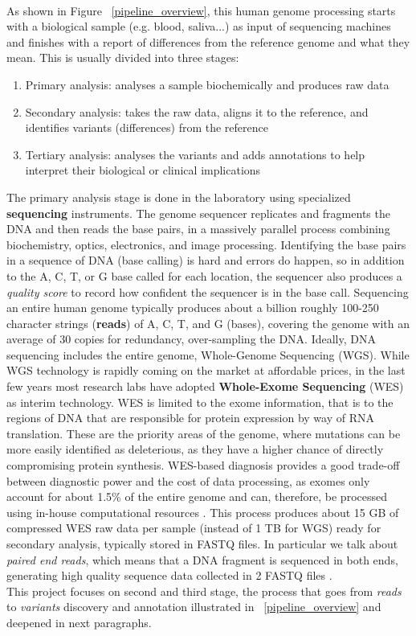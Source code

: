 \\[1\baselineskip]
As shown in Figure ~\ref{pipeline_overview}, this human genome processing starts with a biological sample (e.g. blood, saliva...) as input of sequencing machines and finishes with a report of differences from the reference genome and what they mean. This is usually divided into three stages:
\begin{enumerate}
	\item Primary analysis: analyses a sample
biochemically and produces raw data
	\item Secondary analysis: takes the raw data,
aligns it to the reference, and identifies variants
(differences) from the reference
    \item Tertiary analysis: analyses the variants
and adds annotations to help interpret their
biological or clinical implications
\end{enumerate}
The primary analysis stage is done in the laboratory using specialized \textbf{sequencing} instruments. The genome sequencer replicates and fragments the DNA and then reads the base pairs, in a massively parallel process combining biochemistry, optics, electronics, and image processing. Identifying the base pairs in a sequence of DNA (base calling) is hard and errors do happen, so in addition to the A, C, T, or G base called for each location, the sequencer also produces a \textit{quality score} to record how confident the sequencer is in the base call. Sequencing an entire human genome typically produces about a billion roughly 100-250 character strings (\textbf{reads}) of A, C, T, and G (bases), covering the genome with an average of 30 copies for redundancy, over-sampling the DNA.\newline
Ideally, DNA sequencing includes the entire genome, Whole-Genome Sequencing (WGS).
While WGS technology is rapidly coming on the market at affordable prices, in the last few years most research labs have adopted \textbf{Whole-Exome Sequencing} (WES) as interim technology. WES is limited to the exome information, that is to the regions of DNA that are responsible for protein expression by way of RNA translation. These are the priority areas of the genome, where mutations can be more easily identified as deleterious, as they have a higher chance of directly compromising protein synthesis. WES-based diagnosis provides a good trade-off between diagnostic power and the cost of data processing, as exomes only account for about 1.5\% of the entire genome and can, therefore, be processed using in-house computational resources \cite{ScalableEfficientWhole-ExomeProcessing}.\newline
This process produces about 15 GB of compressed WES raw data per sample (instead of 1 TB for WGS) ready for secondary analysis, typically stored in FASTQ files. In particular we talk about \textit{paired end reads}, which means that a DNA fragment is sequenced in both ends, generating high quality sequence data collected in 2 FASTQ files \cite{PairedEnd, MicrosoftGenomics}.
\\[1\baselineskip]
This project focuses on second and third stage, the process that goes from \textit{reads} to \textit{variants} discovery and annotation illustrated in ~\ref{pipeline_overview} and deepened in next paragraphs.

